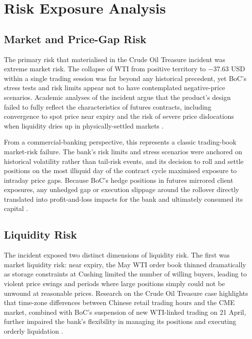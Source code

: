 \documentclass[a4paper,11pt]{article}
\begin{document}
\section{Risk Exposure Analysis}

\subsection{Market and Price-Gap Risk}

The primary risk that materialised in the Crude Oil Treasure incident
was extreme market risk. The collapse of WTI from positive territory
to $-$37.63 USD within a single trading session was far beyond any
historical precedent, yet BoC's stress tests and risk limits appear
not to have contemplated negative-price scenarios. Academic analyses
of the incident argue that the product's design failed to fully
reflect the characteristics of futures contracts, including
convergence to spot price near expiry and the risk of severe price
dislocations when liquidity dries up in physically-settled markets
\cite{oilprice2020fine}.

From a commercial-banking perspective, this represents a classic
trading-book market-risk failure. The bank's risk limits and stress
scenarios were anchored on historical volatility rather than
tail-risk events, and its decision to roll and settle positions on
the most illiquid day of the contract cycle maximised exposure to
intraday price gaps. Because BoC's hedge positions in futures
mirrored client exposures, any unhedged gap or execution slippage
around the rollover directly translated into profit-and-loss impacts
for the bank and ultimately consumed its capital \cite{atlantis2021analysis}.

\subsection{Liquidity Risk}

The incident exposed two distinct dimensions of liquidity risk. The
first was market liquidity risk: near expiry, the May WTI order book
thinned dramatically as storage constraints at Cushing limited the
number of willing buyers, leading to violent price swings and periods
where large positions simply could not be unwound at reasonable
prices. Research on the Crude Oil Treasure case highlights that
time-zone differences between Chinese retail trading hours and the
CME market, combined with BoC's suspension of new WTI-linked trading
on 21 April, further impaired the bank's flexibility in managing its
positions and executing orderly liquidation \cite{atlantis2021fmet}.
\end{document}
